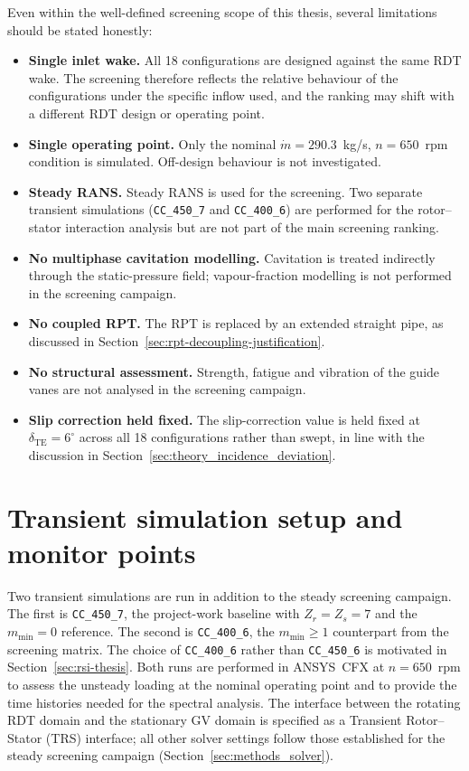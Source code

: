 Even within the well-defined screening scope of this thesis, several limitations should be stated honestly:
\begin{itemize}
  \item \textbf{Single inlet wake.} All 18 configurations are designed against the same RDT wake. The screening therefore reflects the relative behaviour of the configurations under the specific inflow used, and the ranking may shift with a different RDT design or operating point.
  \item \textbf{Single operating point.} Only the nominal $\dot m = 290.3$~kg/s, $n = 650$~rpm condition is simulated. Off-design behaviour is not investigated.
  \item \textbf{Steady RANS.} Steady RANS is used for the screening. Two separate transient simulations (\texttt{CC\_450\_7} and \texttt{CC\_400\_6}) are performed for the rotor--stator interaction analysis but are not part of the main screening ranking.
  \item \textbf{No multiphase cavitation modelling.} Cavitation is treated indirectly through the static-pressure field; vapour-fraction modelling is not performed in the screening campaign.
  \item \textbf{No coupled RPT.} The RPT is replaced by an extended straight pipe, as discussed in Section~\ref{sec:rpt-decoupling-justification}.
  \item \textbf{No structural assessment.} Strength, fatigue and vibration of the guide vanes are not analysed in the screening campaign.
  \item \textbf{Slip correction held fixed.} The slip-correction value is held fixed at $\delta_{\mathrm{TE}} = 6^\circ$ across all 18 configurations rather than swept, in line with the discussion in Section~\ref{sec:theory_incidence_deviation}.
\end{itemize}

\section{Transient simulation setup and monitor points}
\label{sec:monitor-setup}
 
Two transient simulations are run in addition to the steady screening campaign. The first is \texttt{CC\_450\_7}, the project-work baseline with $Z_r=Z_s=7$ and the $m_{\min}=0$ reference. The second is \texttt{CC\_400\_6}, the $m_{\min}\geq 1$ counterpart from the screening matrix. The choice of \texttt{CC\_400\_6} rather than \texttt{CC\_450\_6} is motivated in Section~\ref{sec:rsi-thesis}. Both runs are performed in ANSYS~CFX at $n = 650$~rpm to assess the unsteady loading at the nominal operating point and to provide the time histories needed for the spectral analysis. The interface between the rotating RDT domain and the stationary GV domain is specified as a Transient Rotor--Stator (TRS) interface; all other solver settings follow those established for the steady screening campaign (Section~\ref{sec:methods_solver}).
 
